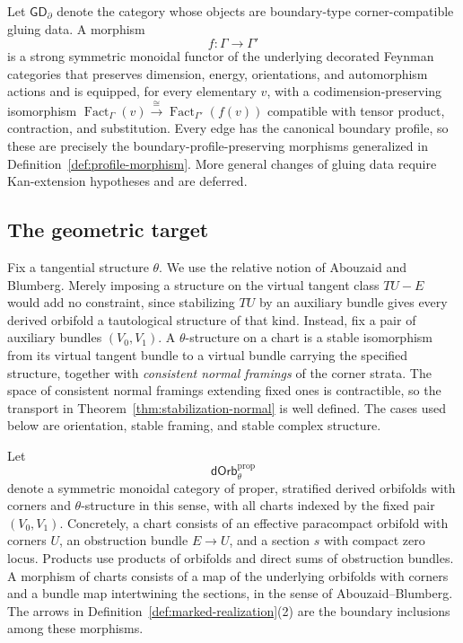 \documentclass[11pt,letterpaper,twoside]{article}
\theoremstyle{plain}
\theoremstyle{definition}
\theoremstyle{remark}
\newcommand{\BGrm}{\mathsf{GD}_{\partial}}
\newcommand{\dOrb}{\mathsf{dOrb}}
\DeclareMathOperator{\Fact}{Fact}
\begin{document}
Let \(\BGrm\) denote the category whose objects are boundary-type corner-compatible gluing data.  A morphism
\[
 f:\Gamma\longrightarrow\Gamma'
\]
is a strong symmetric monoidal functor of the underlying decorated Feynman categories that preserves dimension, energy, orientations, and automorphism actions and is equipped, for every elementary \(v\), with a codimension-preserving isomorphism
\(
\Fact_\Gamma(v)\xrightarrow{\cong}\Fact_{\Gamma'}(f(v))
\)
compatible with tensor product, contraction, and substitution.  Every edge has the canonical boundary profile, so these are precisely the boundary-profile-preserving morphisms generalized in Definition~\ref{def:profile-morphism}.  More general changes of gluing data require Kan-extension hypotheses and are deferred.

\subsection{The geometric target}

Fix a tangential structure \(\theta\).  We use the relative notion of Abouzaid and Blumberg.  Merely imposing a structure on the virtual tangent class \(TU-E\) would add no constraint, since stabilizing \(TU\) by an auxiliary bundle gives every derived orbifold a tautological structure of that kind.  Instead, fix a pair of auxiliary bundles \((V_0,V_1)\).  A \(\theta\)-structure on a chart is a stable isomorphism from its virtual tangent bundle to a virtual bundle carrying the specified structure, together with \emph{consistent normal framings} of the corner strata.  The space of consistent normal framings extending fixed ones is contractible, so the transport in Theorem~\ref{thm:stabilization-normal} is well defined.  The cases used below are orientation, stable framing, and stable complex structure.

Let
\[
 \dOrb_\theta^{\mathrm{prop}}
\]
denote a symmetric monoidal category of proper, stratified derived orbifolds with corners and \(\theta\)-structure in this sense, with all charts indexed by the fixed pair \((V_0,V_1)\).  Concretely, a chart consists of an effective paracompact orbifold with corners \(U\), an obstruction bundle \(E\to U\), and a section \(s\) with compact zero locus.  Products use products of orbifolds and direct sums of obstruction bundles.  A morphism of charts consists of a map of the underlying orbifolds with corners and a bundle map intertwining the sections, in the sense of Abouzaid--Blumberg.  The arrows in Definition~\ref{def:marked-realization}(2) are the boundary inclusions among these morphisms.
\end{document}
